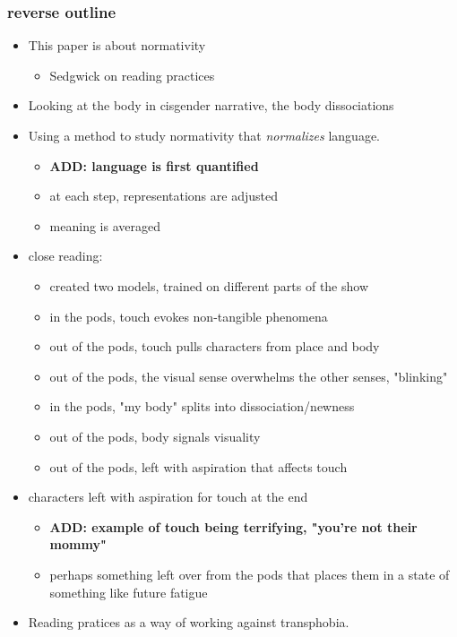 \documentclass[11pt]{article}
\begin{document}
\subsubsection{reverse outline}
\label{sec:org1019035}
\begin{itemize}
\item This paper is about normativity
\begin{itemize}
\item Sedgwick on reading practices
\end{itemize}
\item Looking at the body in cisgender narrative, the body dissociations
\item Using a method to study normativity that \emph{normalizes} language.
\begin{itemize}
\item \textbf{ADD: language is first quantified}
\item at each step, representations are adjusted
\item meaning is averaged
\end{itemize}
\item close reading:
\begin{itemize}
\item created two models, trained on different parts of the show
\item in the pods, touch evokes non-tangible phenomena
\item out of the pods, touch pulls characters from place and body
\item out of the pods, the visual sense overwhelms the other senses,
"blinking"
\item in the pods, "my body" splits into dissociation/newness
\item out of the pods, body signals visuality
\item out of the pods, left with aspiration that affects touch
\end{itemize}
\item characters left with aspiration for touch at the end
\begin{itemize}
\item \textbf{ADD: example of touch being terrifying, "you're not their mommy"}
\item perhaps something left over from the pods that places them in a
state of something like future fatigue
\end{itemize}
\item Reading pratices as a way of working against transphobia.
\end{itemize}
\end{document}
